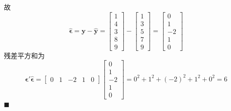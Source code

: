 
故
\[
\hat{\boldsymbol{\epsilon}}=\mathbf{y}-\hat{\mathbf{y}}
=\begin{bmatrix}1\\4\\3\\8\\9\end{bmatrix}-\begin{bmatrix}1\\3\\5\\7\\9\end{bmatrix}
=\begin{bmatrix}0\\1\\-2\\1\\0\end{bmatrix}
\]
残差平方和为
\[
\hat{\boldsymbol{\epsilon}}'\hat{\boldsymbol{\epsilon}}
=\begin{bmatrix}0&1&-2&1&0\end{bmatrix}\begin{bmatrix}0\\1\\-2\\1\\0\end{bmatrix}
=0^2+1^2+(-2)^2+1^2+0^2=6
\]
\noindent\hfill$\blacksquare$


